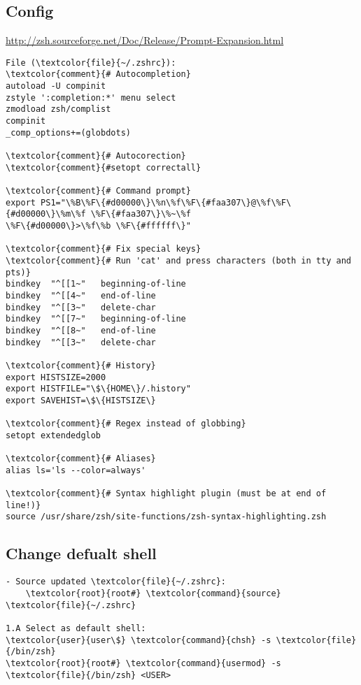\documentclass[10pt, a4paper, onecolumn, openany]{book}         %
\begin{document}
\subsection{Config}
\underline{\url{http://zsh.sourceforge.net/Doc/Release/Prompt-Expansion.html}}\newline
\begin{Verbatim}[commandchars=\\\{\}]
File (\textcolor{file}{~/.zshrc}):
\textcolor{comment}{# Autocompletion}
autoload -U compinit 
zstyle ':completion:*' menu select
zmodload zsh/complist
compinit
_comp_options+=(globdots)

\textcolor{comment}{# Autocorection}
\textcolor{comment}{#setopt correctall}

\textcolor{comment}{# Command prompt}
export PS1="\%B\%F\{#d00000\}\%n\%f\%F\{#faa307\}@\%f\%F\{#d00000\}\%m\%f \%F\{#faa307\}\%~\%f
\%F\{#d00000\}>\%f\%b \%F\{#ffffff\}" 

\textcolor{comment}{# Fix special keys}
\textcolor{comment}{# Run 'cat' and press characters (both in tty and pts)}
bindkey  "^[[1~"   beginning-of-line
bindkey  "^[[4~"   end-of-line
bindkey  "^[[3~"   delete-char
bindkey  "^[[7~"   beginning-of-line
bindkey  "^[[8~"   end-of-line
bindkey  "^[[3~"   delete-char

\textcolor{comment}{# History}
export HISTSIZE=2000
export HISTFILE="\$\{HOME\}/.history" 
export SAVEHIST=\$\{HISTSIZE\}

\textcolor{comment}{# Regex instead of globbing}
setopt extendedglob

\textcolor{comment}{# Aliases}
alias ls='ls --color=always'

\textcolor{comment}{# Syntax highlight plugin (must be at end of line!)}
source /usr/share/zsh/site-functions/zsh-syntax-highlighting.zsh
\end{Verbatim}

\subsection{Change defualt shell}
\begin{Verbatim}[commandchars=\\\{\}]
- Source updated \textcolor{file}{~/.zshrc}:
    \textcolor{root}{root#} \textcolor{command}{source} \textcolor{file}{~/.zshrc}
    
1.A Select as default shell:
\textcolor{user}{user\$} \textcolor{command}{chsh} -s \textcolor{file}{/bin/zsh}
\textcolor{root}{root#} \textcolor{command}{usermod} -s \textcolor{file}{/bin/zsh} <USER>
\end{Verbatim}
\end{document}
